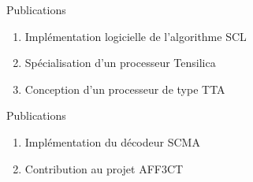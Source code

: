 \documentclass[t,compress,mathserif,12pt,xcolor=dvipsnames]{beamer}
\begin{document}
\begin{frame}[c]{Publications}

  \begin{enumerate}
\renewcommand{\section}[2]{} %

    \renewcommand*{\bibfont}{\scriptsize}
    \nocite{leonardon_fast_2017,leonardon_custom_2018,ghaffari_improving_2017,leonardon_tta_2018,Ghaffari2018,cassagne_fast_2017,cassagne_gdr_2017,leonardon_custom_2018}
    \vfill
    \item<+-> Implémentation logicielle de l'algorithme  SCL
    \scriptsize{\printbibliography[keyword={fast-scl}]}
    \vfill
    \item<+-> Spécialisation d'un processeur Tensilica
    \scriptsize{\printbibliography[keyword={tensilica}]}
    \vfill
    \item<+-> Conception d'un processeur de type TTA
    \scriptsize{\printbibliography[keyword={tta}]}
    \vfill
  \end{enumerate}

\end{frame}

\begin{frame}[c]{Publications}

  \begin{enumerate}
\renewcommand{\section}[2]{} %

    \renewcommand*{\bibfont}{\scriptsize}
    \nocite{leonardon_fast_2017,leonardon_custom_2018,ghaffari_improving_2017,leonardon_tta_2018,Ghaffari2018,cassagne_fast_2017,cassagne_gdr_2017}
    \vfill
    \item<+-> Implémentation du décodeur SCMA
    \printbibliography[keyword={ghaffari}]
    \vfill
    \item<+-> Contribution au projet AFF3CT
    \printbibliography[keyword={aff3ct}]
    \vfill
  \end{enumerate}

\end{frame}
\end{document}
